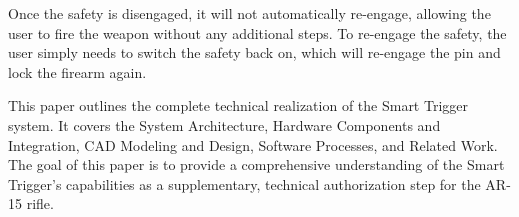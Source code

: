 Once the safety is disengaged, it will not automatically re-engage, allowing the user to fire the weapon without any additional steps. To re-engage the safety, the user simply needs to switch the safety back on, which will re-engage the pin and lock the firearm again. 

This paper outlines the complete technical realization of the Smart Trigger system. It covers the System Architecture, Hardware Components and Integration, CAD Modeling and Design, Software Processes, and Related Work. The goal of this paper is to provide a comprehensive understanding of the Smart Trigger's capabilities as a supplementary, technical authorization step for the AR-15 rifle.